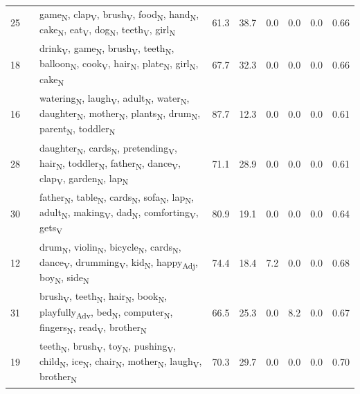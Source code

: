 \begin{landscape}
\begin{xltabular}{\linewidth}{r >{\raggedright\arraybackslash}p{2.9cm} >{\raggedright\arraybackslash}X r r r r r r}
25 &  & game\textsubscript{N}, clap\textsubscript{V}, brush\textsubscript{V}, food\textsubscript{N}, hand\textsubscript{N}, cake\textsubscript{N}, eat\textsubscript{V}, dog\textsubscript{N}, teeth\textsubscript{V}, girl\textsubscript{N} & 61.3 & 38.7 & 0.0 & 0.0 & 0.0 & 0.66 \\
18 &  & drink\textsubscript{V}, game\textsubscript{N}, brush\textsubscript{V}, teeth\textsubscript{N}, balloon\textsubscript{N}, cook\textsubscript{V}, hair\textsubscript{N}, plate\textsubscript{N}, girl\textsubscript{N}, cake\textsubscript{N} & 67.7 & 32.3 & 0.0 & 0.0 & 0.0 & 0.66 \\
16 &  & watering\textsubscript{N}, laugh\textsubscript{V}, adult\textsubscript{N}, water\textsubscript{N}, daughter\textsubscript{N}, mother\textsubscript{N}, plants\textsubscript{N}, drum\textsubscript{N}, parent\textsubscript{N}, toddler\textsubscript{N} & 87.7 & 12.3 & 0.0 & 0.0 & 0.0 & 0.61 \\
28 &  & daughter\textsubscript{N}, cards\textsubscript{N}, pretending\textsubscript{V}, hair\textsubscript{N}, toddler\textsubscript{N}, father\textsubscript{N}, dance\textsubscript{V}, clap\textsubscript{V}, garden\textsubscript{N}, lap\textsubscript{N} & 71.1 & 28.9 & 0.0 & 0.0 & 0.0 & 0.61 \\
30 &  & father\textsubscript{N}, table\textsubscript{N}, cards\textsubscript{N}, sofa\textsubscript{N}, lap\textsubscript{N}, adult\textsubscript{N}, making\textsubscript{V}, dad\textsubscript{N}, comforting\textsubscript{V}, gets\textsubscript{V} & 80.9 & 19.1 & 0.0 & 0.0 & 0.0 & 0.64 \\
12 &  & drum\textsubscript{N}, violin\textsubscript{N}, bicycle\textsubscript{N}, cards\textsubscript{N}, dance\textsubscript{V}, drumming\textsubscript{V}, kid\textsubscript{N}, happy\textsubscript{Adj}, boy\textsubscript{N}, side\textsubscript{N} & 74.4 & 18.4 & 7.2 & 0.0 & 0.0 & 0.68 \\
31 &  & brush\textsubscript{V}, teeth\textsubscript{N}, hair\textsubscript{N}, book\textsubscript{N}, playfully\textsubscript{Adv}, bed\textsubscript{N}, computer\textsubscript{N}, fingers\textsubscript{N}, read\textsubscript{V}, brother\textsubscript{N} & 66.5 & 25.3 & 0.0 & 8.2 & 0.0 & 0.67 \\
19 &  & teeth\textsubscript{N}, brush\textsubscript{V}, toy\textsubscript{N}, pushing\textsubscript{V}, child\textsubscript{N}, ice\textsubscript{N}, chair\textsubscript{N}, mother\textsubscript{N}, laugh\textsubscript{V}, brother\textsubscript{N} & 70.3 & 29.7 & 0.0 & 0.0 & 0.0 & 0.70 \\

\end{xltabular}
\end{landscape}
